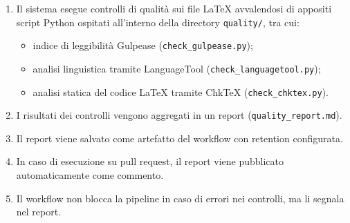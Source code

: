 \documentclass[a4paper, 11pt, oneside]{scrartcl}
\begin{document}
\begin{enumerate}
\begin{enumerate}[label=\alph*.]
              \item Il sistema esegue controlli di qualità sui file \LaTeX{} avvalendosi di appositi script Python ospitati all'interno della directory \texttt{quality/}, tra cui:
                    \begin{itemize}
                        \item indice di leggibilità Gulpease (\texttt{check\_gulpease.py});
                        \item analisi linguistica tramite LanguageTool (\texttt{check\_languagetool.py});
                        \item analisi statica del codice \LaTeX{} tramite ChkTeX (\texttt{check\_chktex.py}).
                    \end{itemize}
              \item I risultati dei controlli vengono aggregati in un report (\texttt{quality\_report.md}).
              \item Il report viene salvato come artefatto del workflow con retention configurata.
              \item In caso di esecuzione su pull request, il report viene pubblicato automaticamente come commento.
              \item Il workflow non blocca la pipeline in caso di errori nei controlli, ma li segnala nel report.
          \end{enumerate}
\end{enumerate}
\end{document}
